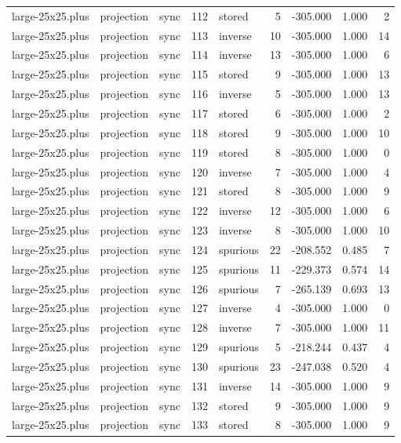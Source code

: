\begin{tabular}{lllrlrrrr}
large-25x25.plus & projection & sync & 112 & stored & 5 & -305.000 & 1.000 & 2 \\
large-25x25.plus & projection & sync & 113 & inverse & 10 & -305.000 & 1.000 & 14 \\
large-25x25.plus & projection & sync & 114 & inverse & 13 & -305.000 & 1.000 & 6 \\
large-25x25.plus & projection & sync & 115 & stored & 9 & -305.000 & 1.000 & 13 \\
large-25x25.plus & projection & sync & 116 & inverse & 5 & -305.000 & 1.000 & 13 \\
large-25x25.plus & projection & sync & 117 & stored & 6 & -305.000 & 1.000 & 2 \\
large-25x25.plus & projection & sync & 118 & stored & 9 & -305.000 & 1.000 & 10 \\
large-25x25.plus & projection & sync & 119 & stored & 8 & -305.000 & 1.000 & 0 \\
large-25x25.plus & projection & sync & 120 & inverse & 7 & -305.000 & 1.000 & 4 \\
large-25x25.plus & projection & sync & 121 & stored & 8 & -305.000 & 1.000 & 9 \\
large-25x25.plus & projection & sync & 122 & inverse & 12 & -305.000 & 1.000 & 6 \\
large-25x25.plus & projection & sync & 123 & inverse & 8 & -305.000 & 1.000 & 10 \\
large-25x25.plus & projection & sync & 124 & spurious & 22 & -208.552 & 0.485 & 7 \\
large-25x25.plus & projection & sync & 125 & spurious & 11 & -229.373 & 0.574 & 14 \\
large-25x25.plus & projection & sync & 126 & spurious & 7 & -265.139 & 0.693 & 13 \\
large-25x25.plus & projection & sync & 127 & inverse & 4 & -305.000 & 1.000 & 0 \\
large-25x25.plus & projection & sync & 128 & inverse & 7 & -305.000 & 1.000 & 11 \\
large-25x25.plus & projection & sync & 129 & spurious & 5 & -218.244 & 0.437 & 4 \\
large-25x25.plus & projection & sync & 130 & spurious & 23 & -247.038 & 0.520 & 4 \\
large-25x25.plus & projection & sync & 131 & inverse & 14 & -305.000 & 1.000 & 9 \\
large-25x25.plus & projection & sync & 132 & stored & 9 & -305.000 & 1.000 & 9 \\
large-25x25.plus & projection & sync & 133 & stored & 8 & -305.000 & 1.000 & 9 \\

\end{tabular}
